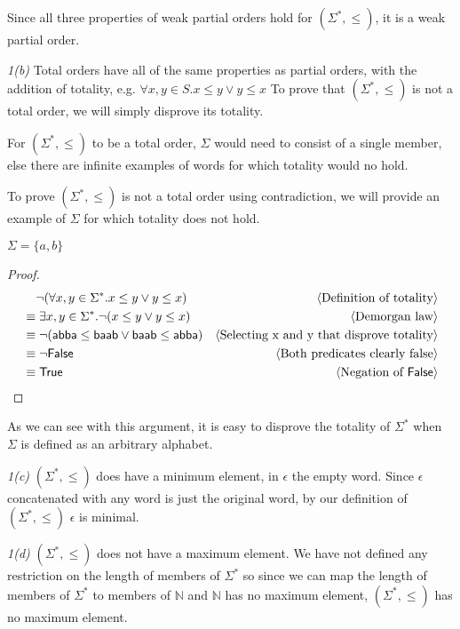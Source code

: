 \documentclass[11pt,fleqn]{article}
\newcommand{\mname}[1]{\mbox{\sf #1}}
\newcommand{\pnote}[1]{{\langle \text{#1} \rangle}}
\begin{document}
  Since all three properties of weak partial orders hold for 
  $(\Sigma^*, \leq)$, it is a weak partial order.

  \emph{1(b)} Total orders have all of the same properties as partial
  orders, with the addition of totality, e.g. $\forall x,y \in S . x \leq y \lor y \leq x$
  To prove that $(\Sigma^*, \leq)$ is not a total order, we will simply disprove
  its totality.

  \medskip

  For $(\Sigma^*, \leq)$ to be a total order, $\Sigma$ would need to consist
  of a single member, else there are infinite examples of words for which
  totality would no hold.

  To prove $(\Sigma^*, \leq)$ is not a total order using contradiction,
  we will provide an example of $\Sigma$ for which totality does not hold.

  $\Sigma = \{a, b\}$

  \begin{proof}
    \begin{align*}
      &\phantom{{}=} \lnot (\forall x, y \in \Sigma^* . x \leq y \lor y \leq x) &\pnote{Definition of totality}\\
      &\equiv \exists x, y \in \Sigma^* . \lnot (x \leq y \lor y \leq x) & \pnote{Demorgan law}\\
      &\equiv \lnot (\mname{abba} \leq \mname{baab} \lor \mname{baab} \leq \mname{abba}) &\pnote{Selecting x and y that disprove totality}\\
      &\equiv \lnot \mname{False} & \pnote{Both predicates clearly false}\\
      &\equiv \mname{True} & \pnote{Negation of $\mname{False}$}\\
    \end{align*}
  \end{proof}

  As we can see with this argument, it is easy to disprove the totality of 
  $\Sigma^*$ when $\Sigma$ is defined as an arbitrary alphabet.

  \medskip
  \emph{1(c)}
  $(\Sigma^*, \leq)$ does have a minimum element, in $\epsilon$ the empty
  word. Since $\epsilon$ concatenated with any word is just the original
  word, by our definition of $(\Sigma^*, \leq)$  $\epsilon$ is minimal.

  \medskip
  \emph{1(d)}
  $(\Sigma^*, \leq)$ does not have a maximum element. We have not defined
  any restriction on the length of members of $\Sigma^*$ so since we can
  map the length of members of $\Sigma^*$ to members of $\mathbb{N}$ 
  and $\mathbb{N}$ has no maximum element, $(\Sigma^*, \leq)$ has no 
  maximum element.
\end{document}
